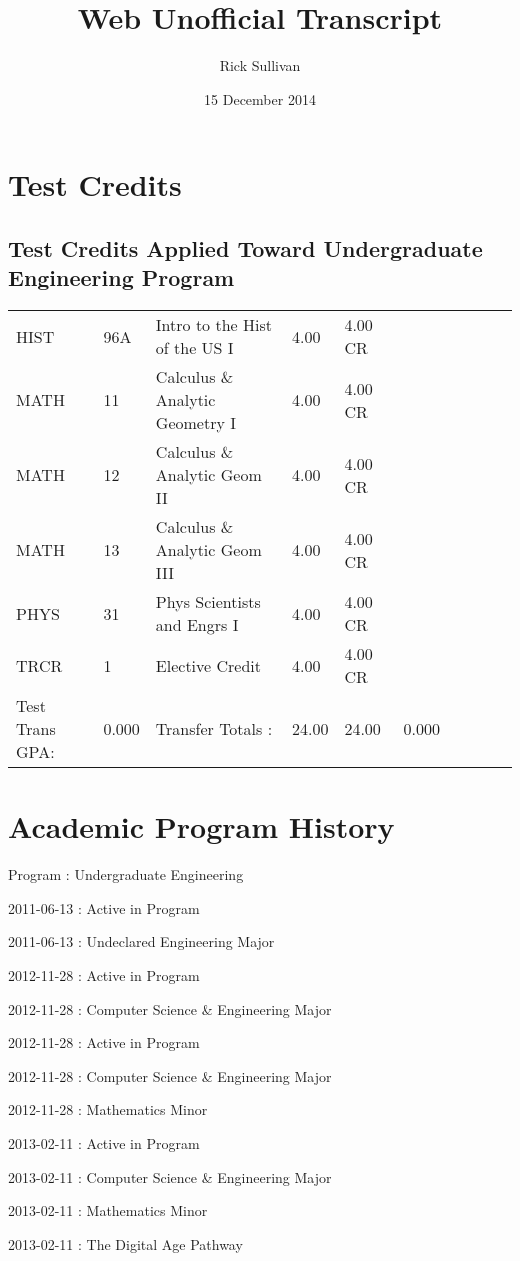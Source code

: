 \documentclass{scrartcl}\usepackage[T1]{fontenc}
\title{Web Unofficial Transcript}
\author{Rick Sullivan}
\date{15 December 2014}
\begin{document}
\maketitle

\section{Test Credits}
\subsection{Test Credits Applied Toward Undergraduate Engineering Program}
\begin{tabular}{ l  l  l  l  l  l  l  l  l  l }
HIST&96A&Intro to the Hist of the US I&4.00&4.00 CR& & & & & \\
MATH&11&Calculus \& Analytic Geometry I&4.00&4.00 CR& & & & & \\
MATH&12&Calculus \& Analytic Geom II&4.00&4.00 CR& & & & & \\
MATH&13&Calculus \& Analytic Geom III&4.00&4.00 CR& & & & & \\
PHYS&31&Phys Scientists and Engrs I&4.00&4.00 CR& & & & & \\
TRCR&1&Elective Credit&4.00&4.00 CR& & & & & \\
Test Trans GPA:&0.000&Transfer Totals :&24.00&24.00&0.000& & & & \\\end{tabular}
\section{Academic Program History}
Program	:	Undergraduate Engineering \

2011-06-13	:	Active in Program \

2011-06-13 : Undeclared Engineering Major \

2012-11-28	:	Active in Program \

2012-11-28 : Computer Science \& Engineering Major \

2012-11-28	:	Active in Program \

2012-11-28 : Computer Science \& Engineering Major \

2012-11-28 : Mathematics Minor \

2013-02-11	:	Active in Program \

2013-02-11 : Computer Science \& Engineering Major \

2013-02-11 : Mathematics Minor \

2013-02-11 : The Digital Age Pathway \
\end{document}
